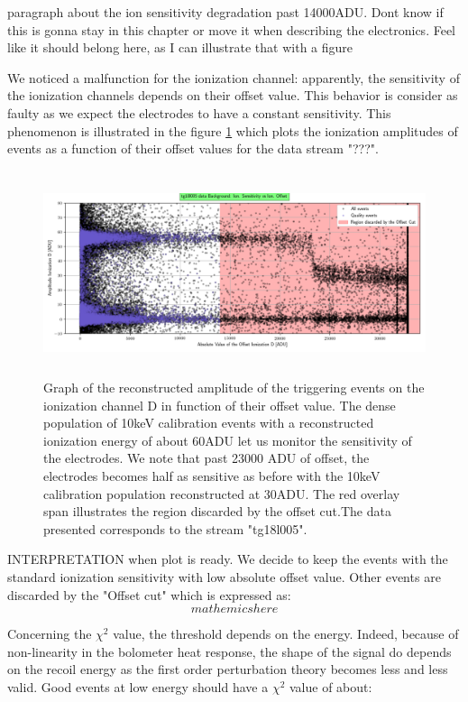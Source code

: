 {\color{red} paragraph about the ion sensitivity degradation past 14000ADU. Dont know if this is gonna stay in this chapter or move it when describing the electronics. Feel like it should belong here, as I can illustrate that with a figure}

We noticed a malfunction for the ionization channel: apparently, the sensitivity of the ionization channels depends on their offset value. This behavior is consider as faulty as we expect the electrodes to have a constant sensitivity. This phenomenon is illustrated in the figure \ref{fig:offset-problem} which plots the ionization amplitudes of events as a function of their offset values for the data stream "???".

\begin{figure}
\centering
\includegraphics[width=\linewidth, height=6cm]{Figures/Neutron/offset_cut.png}
\caption{Graph of the reconstructed amplitude of the triggering events on the ionization channel D in function of their offset value. The dense population of 10keV calibration events with a reconstructed ionization energy of about 60ADU let us monitor the sensitivity of the electrodes. We note that past 23000 ADU of offset, the electrodes becomes half as sensitive as before with the 10keV calibration population reconstructed at 30ADU. The red overlay span illustrates the region discarded by the offset cut.The data presented corresponds to the stream "tg18l005". }
\label{fig:offset-problem}
\end{figure}

INTERPRETATION when plot is ready.
We decide to keep the events with the standard ionization sensitivity with low absolute offset value. Other events are discarded by the "Offset cut" which is expressed as:
$$ mathemics here $$


Concerning the $\chi^2$ value, the threshold depends on the energy. Indeed, because of non-linearity in the bolometer heat response, the shape of the signal do depends on the recoil energy as the first order perturbation theory becomes less and less valid.
Good events at low energy should have a $\chi^2$ value of about:

